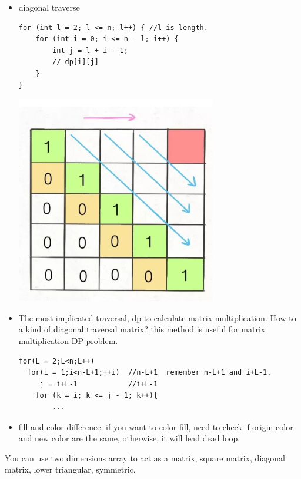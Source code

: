 \documentclass[a4paper,11pt,twoside]{book}
\begin{document}
\begin{itemize}
	\item diagonal traverse
\begin{lstlisting}
for (int l = 2; l <= n; l++) { //l is length.
	for (int i = 0; i <= n - l; i++) {
		int j = l + i - 1;
		// dp[i][j]
	}
}
\end{lstlisting}
		
		\begin{center}
			\includegraphics[scale=0.60]{pics/md.png}
		\end{center}
	 
	
	
	\item The most implicated traversal, dp to calculate matrix multiplication. How to a kind of diagonal traversal matrix? this method is useful for matrix multiplication DP problem. 
	
\begin{lstlisting}
for(L = 2;L<n;L++)
  for(i = 1;i<n-L+1;++i)  //n-L+1  remember n-L+1 and i+L-1. 
     j = i+L-1            //i+L-1
  	for (k = i; k <= j - 1; k++){
  		...
\end{lstlisting}

	\item fill and color difference. if you want to color fill, need to check if origin color and new color are the same, otherwise, it will lead dead loop. 
\end{itemize}	

	\par  You can use two dimensions array to act as a matrix, square matrix, diagonal matrix, lower triangular, symmetric. 
	
	
\end{document}
